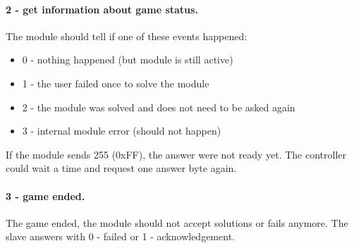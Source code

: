 \documentclass[a4paper, 12pt]{article}
\begin{document}
\paragraph*{2 - get information about game status.}
The module should tell if one of these events happened:
\begin{itemize}
\setlength{\itemsep}{0pt}
\item 0 - nothing happened (but module is still active)
\item 1 - the user failed once to solve the module
\item 2 - the module was solved and does not need to be asked again
\item 3 - internal module error (should not happen)
\end{itemize}
If the module sends 255 (0xFF), the answer were not ready yet. The controller could wait a time and request one answer byte again.

\paragraph*{3 - game ended.}
The game ended, the module should not accept solutions or fails anymore. The slave answers with 0 - failed or 1 - acknowledgement.
\end{document}
